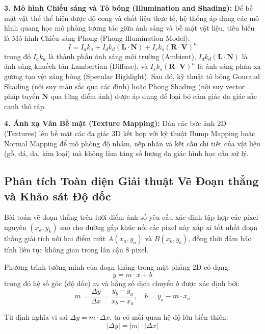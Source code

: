\textbf{3. Mô hình Chiếu sáng và Tô bóng (Illumination and Shading):}
Để bề mặt vật thể thể hiện được độ cong và chất liệu thực tế, hệ thống áp dụng các mô hình quang học mô phỏng tương tác giữa ánh sáng và bề mặt vật liệu, tiêu biểu là Mô hình Chiếu sáng Phong (Phong Illumination Model):
\begin{equation}
I = I_a k_a + I_d k_d (\mathbf{L} \cdot \mathbf{N}) + I_s k_s (\mathbf{R} \cdot \mathbf{V})^n
\end{equation}
trong đó $I_a k_a$ là thành phần ánh sáng môi trường (Ambient), $I_d k_d (\mathbf{L} \cdot \mathbf{N})$ là ánh sáng khuếch tán Lambertian (Diffuse), và $I_s k_s (\mathbf{R} \cdot \mathbf{V})^n$ là ánh sáng phản xạ gương tạo vệt sáng bóng (Specular Highlight). Sau đó, kỹ thuật tô bóng Gouraud Shading (nội suy màu sắc qua các đỉnh) hoặc Phong Shading (nội suy vector pháp tuyến $\mathbf{N}$ qua từng điểm ảnh) được áp dụng để loại bỏ cảm giác đa giác sắc cạnh thô ráp.

\textbf{4. Ánh xạ Vân Bề mặt (Texture Mapping):}
Dán các bức ảnh 2D (Textures) lên bề mặt các đa giác 3D kết hợp với kỹ thuật Bump Mapping hoặc Normal Mapping để mô phỏng độ nhám, nếp nhăn và kết cấu chi tiết của vật liệu (gỗ, đá, da, kim loại) mà không làm tăng số lượng đa giác hình học cần xử lý.

\subsection{Phân tích Toàn diện Giải thuật Vẽ Đoạn thẳng và Khảo sát Độ dốc}
\label{subsec:w4_dda}

Bài toán vẽ đoạn thẳng trên lưới điểm ảnh số yêu cầu xác định tập hợp các pixel nguyên $(x_k, y_k)$ sao cho đường gấp khúc nối các pixel này xấp xỉ tốt nhất đoạn thẳng giải tích nối hai điểm mút $A(x_a, y_a)$ và $B(x_b, y_b)$, đồng thời đảm bảo tính liên tục không gian trong lân cận 8 pixel.

Phương trình tường minh của đoạn thẳng trong mặt phẳng 2D có dạng:
\begin{equation}
y = m \cdot x + b
\end{equation}
trong đó hệ số góc (độ dốc) $m$ và hằng số dịch chuyển $b$ được xác định bởi:
\begin{equation}
m = \frac{\Delta y}{\Delta x} = \frac{y_b - y_a}{x_b - x_a}, \quad b = y_a - m \cdot x_a
\end{equation}

Từ định nghĩa vi sai $\Delta y = m \cdot \Delta x$, ta có mối quan hệ độ lớn biến thiên:
\begin{equation}
|\Delta y| = |m| \cdot |\Delta x|
\end{equation}

